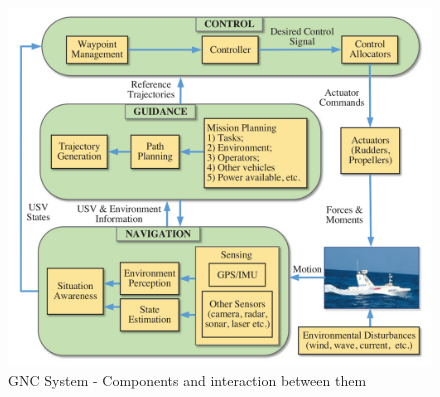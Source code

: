     \begin{figure}[H]
        \centering
        \includegraphics[scale=0.7]{figs/Chap2/Liu2016Unmanned_GNCSystem.png}
        \caption{\ac{GNC} System - Components and interaction between them \cite{Liu2016Unmanned}}
        \label{fig:Liu2016Unmanned_GNCSystem}
    \end{figure}
    
    
        
        
        
